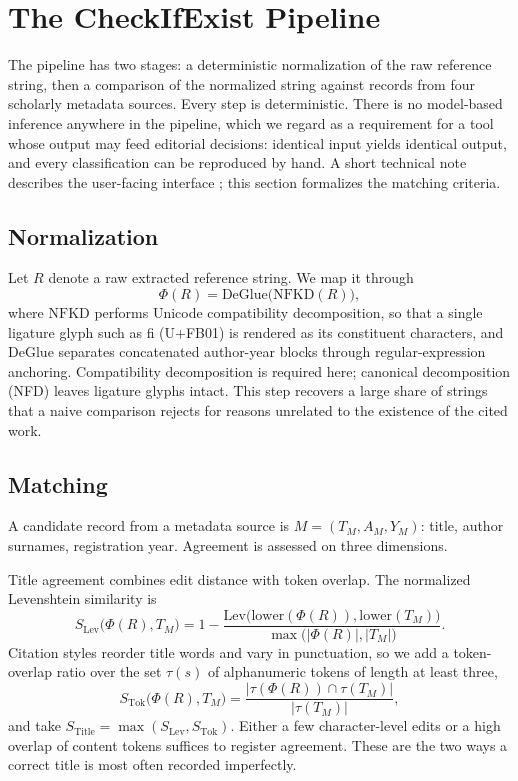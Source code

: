 \documentclass[11pt, a4paper]{article}
\begin{document}
\section{The CheckIfExist Pipeline}
The pipeline has two stages: a deterministic normalization of the raw reference string, then a comparison of the normalized string against records from four scholarly metadata sources. Every step is deterministic. There is no model-based inference anywhere in the pipeline, which we regard as a requirement for a tool whose output may feed editorial decisions: identical input yields identical output, and every classification can be reproduced by hand. A short technical note describes the user-facing interface \citep{abbonato2026}; this section formalizes the matching criteria.

\subsection{Normalization}
Let $R$ denote a raw extracted reference string. We map it through
$$\Phi(R) = \mathrm{DeGlue}\big(\mathrm{NFKD}(R)\big),$$
where $\mathrm{NFKD}$ performs Unicode compatibility decomposition, so that a single ligature glyph such as fi (U+FB01) is rendered as its constituent characters, and $\mathrm{DeGlue}$ separates concatenated author-year blocks through regular-expression anchoring. Compatibility decomposition is required here; canonical decomposition (NFD) leaves ligature glyphs intact. This step recovers a large share of strings that a naive comparison rejects for reasons unrelated to the existence of the cited work.

\subsection{Matching}
A candidate record from a metadata source is $M = (T_M, A_M, Y_M)$: title, author surnames, registration year. Agreement is assessed on three dimensions.

Title agreement combines edit distance with token overlap. The normalized Levenshtein similarity is
$$S_{\mathrm{Lev}}\big(\Phi(R), T_M\big) = 1 - \frac{\mathrm{Lev}\big(\mathrm{lower}(\Phi(R)), \mathrm{lower}(T_M)\big)}{\max\big(|\Phi(R)|, |T_M|\big)}.$$
Citation styles reorder title words and vary in punctuation, so we add a token-overlap ratio over the set $\tau(s)$ of alphanumeric tokens of length at least three,
$$S_{\mathrm{Tok}}\big(\Phi(R), T_M\big) = \frac{|\tau(\Phi(R)) \cap \tau(T_M)|}{|\tau(T_M)|},$$
and take $S_{\mathrm{Title}} = \max(S_{\mathrm{Lev}}, S_{\mathrm{Tok}})$. Either a few character-level edits or a high overlap of content tokens suffices to register agreement. These are the two ways a correct title is most often recorded imperfectly.
\end{document}
